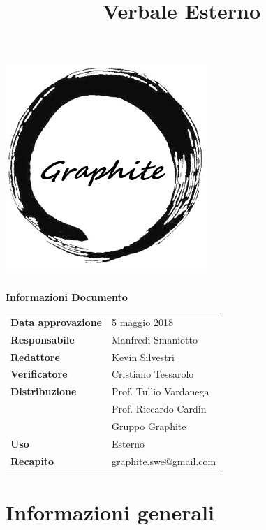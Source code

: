 \documentclass[openany,12pt,a4paper]{article}
\title{Verbale Esterno}
\author{}
\begin{document}
 
  \makeatletter 
  \begin{titlepage} 
    \setlength{\headsep}{0pt}   
    \begin{center} 
      \includegraphics[width=0.5\linewidth]{Logo.png}\\[1em] 
      {\huge \bfseries  \@title }\\[10ex] 
      \textbf{\Large Informazioni Documento} \\[2em] 
      \bgroup 
      \def\arraystretch{1.5} 
      \begin{tabular}{l|l} 
        \textbf{Data approvazione} & 5 maggio 2018 \\ 
        \textbf{Responsabile} & Manfredi Smaniotto \\ 
        \textbf{Redattore} & Kevin Silvestri \\ 
        \textbf{Verificatore} & Cristiano Tessarolo \\ 
        \textbf{Distribuzione} & Prof. Tullio Vardanega \\ 
         & Prof. Riccardo Cardin \\ 
         & Gruppo Graphite \\ 
        \textbf{Uso} & Esterno \\ 
        \textbf{Recapito} & graphite.swe@gmail.com \\ 
      \end{tabular} 
    \egroup 
    \end{center} 
  \end{titlepage} 
  \makeatother 
 
  \thispagestyle{empty} 
  \newpage 
   
  \tableofcontents 
  \newpage 
   
  \section{Informazioni generali} 
   
\end{document}
